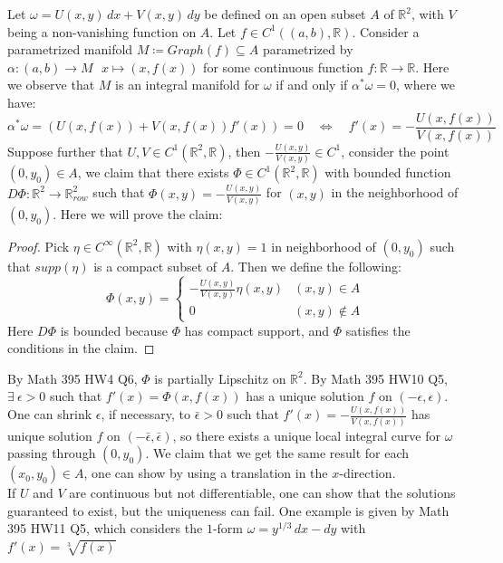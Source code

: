 \documentclass[11pt,oneside]{book}
\theoremstyle{break}
\theoremstyle{break}
\newcommand{\R}{\mathbb{R}}
\begin{document}
Let $\omega = U(x,y)\, dx + V(x,y) \, dy$ be defined on an open subset $A$ of $\R^2$, with $V$ being a non-vanishing function on $A$. Let $f \in C^1((a,b),\R)$. Consider a parametrized manifold $M\coloneqq Graph(f) \subseteq A$ parametrized by $\alpha:(a,b) \to M \ \ \ x\mapsto (x,f(x))$ for some continuous function $f:\R \to \R$. Here we observe that $M$ is an integral manifold for $\omega$ if and only if $\alpha^* \omega = 0$, where we have:
$$\alpha^*\omega = (U(x,f(x))+V(x,f(x))f'(x)) =0 \quad \iff \quad f'(x) =- \frac{U(x,f(x))}{V(x,f(x))}$$ 
Suppose further that $U,V \in C^1(\R^2,\R)$, then $-\frac{U(x,y)}{V(x,y)} \in C^1$, consider the point $(0,y_0) \in A$, we claim that there exists $\Phi \in C^1(\R^2,\R)$ with bounded function $D\Phi :\R^2 \to \R^2_{row}$ such that $\Phi (x,y) = -\frac{U(x,y)}{V(x,y)}$ for $(x,y)$ in the neighborhood of $(0,y_0)$. Here we will prove the claim:
\begin{proof}
Pick $\eta \in C^\infty (\R^2, \R)$ with $\eta(x,y) = 1$ in neighborhood of $(0,y_0)$ such that $supp(\eta)$ is a compact subset of $A$. Then we define the following:
$$\Phi(x,y) = \begin{cases}-\frac{U(x,y)}{V(x,y)}\eta(x,y) & (x,y) \in A \\ 0 &(x,y) \notin A \end{cases}$$
Here $D\Phi$ is bounded because $\Phi$ has compact support, and $\Phi$ satisfies the conditions in the claim. 
\end{proof}
By Math 395 HW4 Q6, $\Phi$ is partially Lipschitz on $\R^2$. By Math 395 HW10 Q5, $\exists\ \epsilon>0$ such that $f'(x) = \Phi(x,f(x))$ has a unique solution $f$ on $(-\epsilon,\epsilon)$. One can shrink $\epsilon$, if necessary, to $\bar{\epsilon}>0$ such that $f'(x) = -\frac{U(x,f(x))}{V(x,f(x))}$ has unique solution $f$ on $(-\bar{\epsilon},\bar{\epsilon})$, so there exists a unique local integral curve for $\omega$ passing through $(0,y_0)$. We claim that we get the same result for each $(x_0,y_0) \in A$, one can show by using a translation in the $x$-direction. \\

If $U$ and $V$ are continuous but not differentiable, one can show that the solutions guaranteed to exist, but the uniqueness can fail. One example is given by Math 395 HW11 Q5, which considers the $1$-form $\omega = y^{1/3}\,dx - dy$ with $f'(x) = \sqrt[3]{f(x)}$\\
\end{document}
